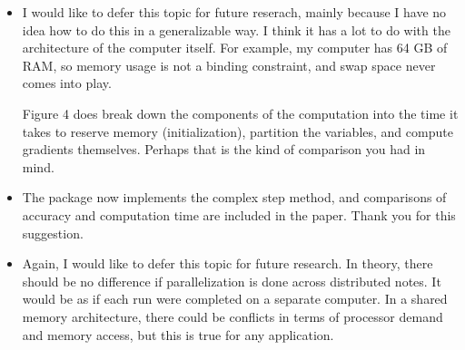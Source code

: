 \documentclass{article}
\newenvironment{response}{\normalfont}{\vspace{\baselineskip}}
\begin{document}
\begin{enumerate}[align=left]
\begin{response}
\begin{itemize}
\item I would like to defer this topic for future reserach, mainly
  because I have no idea how to do this in a generalizable way.  I think
  it has a lot to do with the architecture of the computer
  itself.  For example, my computer has 64 GB of RAM, so memory usage
  is not a binding constraint, and swap space never comes into play.

  Figure 4 does break down the components of the computation
  into the time it takes to reserve memory (initialization), partition
  the variables, and compute gradients themselves.  Perhaps that is
  the kind of comparison you had in mind.

\item The package now implements the complex step method, and comparisons of
  accuracy and computation time are included in the paper.  Thank you
  for this suggestion.

\item Again, I would like to defer this topic for future research. In
  theory, there should be no difference if parallelization is done
  across distributed notes.  It would be as if each run were completed
  on a separate computer.  In a shared memory architecture, there
  could be conflicts in terms of processor demand and memory access,
  but this is true for any application.
    \end{itemize}

    
  \end{response}

\end{enumerate}
\end{document}
